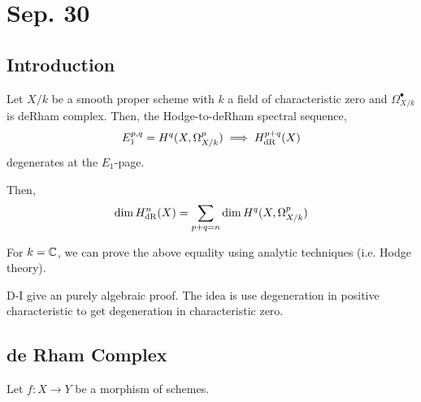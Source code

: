 \documentclass[12pt]{article}
\begin{document}
\section{Sep. 30}

\subsection{Introduction}

\begin{thm}
Let $X / k$ be a smooth proper scheme with $k$ a field of characteristic zero and $\Omega^\bullet_{X/k}$ is deRham complex. Then, the Hodge-to-deRham spectral sequence,
\[ E_1^{p,q} = H^{q}(X, \Omega^p_{X/k}) \implies H_{\mathrm{dR}}^{p+q}(X) \]
degenerates at the $E_1$-page.
\end{thm}

\begin{cor}
Then,
\[ \dim{H^n_{\mathrm{dR}}(X)} = \sum_{p + q = n} \dim{H^q(X, \Omega^p_{X/k})} \]
\end{cor}

\begin{rmk}
For $k = \mathbb{C}$, we can prove the above equality using analytic techniques (i.e. Hodge theory). 
\end{rmk}

\begin{rmk}
D-I give an purely algebraic proof. The idea is use degeneration in positive characteristic to get degeneration in characteristic zero. 
\end{rmk}

\subsection{de Rham Complex}

Let $f : X \to Y$ be a morphism of schemes. 
\end{document}
